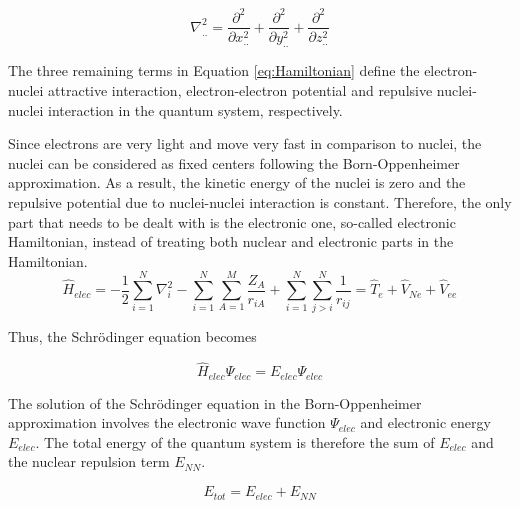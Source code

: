 \begin{refsection}
\begin{equation}
\nabla_{..}^{2} = \frac{\partial^2}{\partial x_{..}^{2}} + \frac{\partial^2}{\partial y_{..}^{2}} + \frac{\partial^2}{\partial z_{..}^{2}}
\label{eq:laplacian}
\end{equation}

\noindent The three remaining terms in Equation \ref{eq:Hamiltonian} define the electron-nuclei attractive interaction, electron-electron potential and repulsive nuclei-nuclei interaction in the quantum system, respectively.

Since electrons are very light and move very fast in comparison to nuclei, the nuclei can be considered as fixed centers following the Born-Oppenheimer approximation.\cite{c1:Oppenheimer1927} As a result, the kinetic energy of the nuclei is zero and the repulsive potential due to nuclei-nuclei interaction is constant. Therefore, the only part that needs to be dealt with is the electronic one, so-called electronic Hamiltonian, instead of treating both nuclear and electronic parts in the Hamiltonian.
\begin{equation}
\widehat{H}_{elec} = -\frac{1}{2}\sum_{i=1}^{N} \nabla_{i}^{2} - 
\sum_{i=1}^{N}\sum_{A=1}^{M}\frac{Z_A}{r_{iA}} + \sum_{i=1}^{N}\sum_{j>i}^{N} 
\frac{1}{r_{ij}} = \widehat{T}_e + \widehat{V}_{Ne} + \widehat{V}_{ee}
\label{eq:HamiltonianElec}
\end{equation}

\noindent Thus, the Schr\"odinger equation becomes

\begin{equation}
\widehat{H}_{elec}\Psi_{elec} = E_{elec}\Psi_{elec}
\label{eq:SchrodingerElec}
\end{equation}

The solution of the Schr\"odinger equation in the Born-Oppenheimer approximation involves the electronic wave function $\Psi_{elec}$ and electronic energy $E_{elec}$. The total energy of the quantum system is therefore the sum of $E_{elec}$ and the nuclear repulsion term $E_{NN}$.

\begin{equation}
E_{tot} = E_{elec} + E_{NN}
\label{Eq:E_total}
\end{equation}




\end{refsection}
